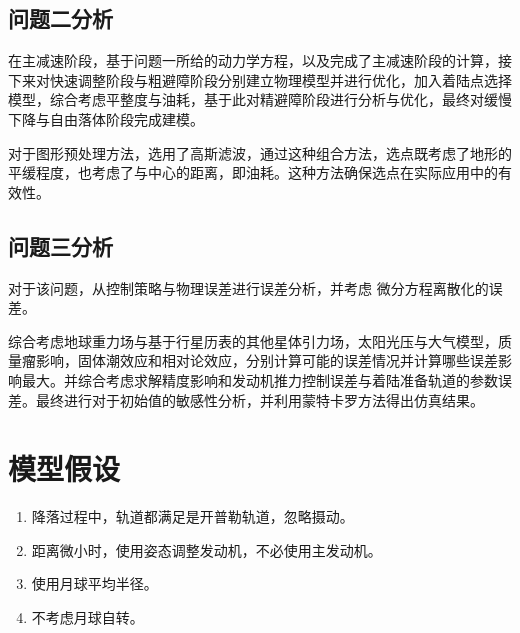 \documentclass{ctexart}
\begin{document}
    \subsection{问题二分析}
    在主减速阶段，基于问题一所给的动力学方程，以及完成了主减速阶段的计算，接下来对快速调整阶段与粗避障阶段分别建立物理模型并进行优化，加入着陆点选择模型，综合考虑平整度与油耗，基于此对精避障阶段进行分析与优化，最终对缓慢下降与自由落体阶段完成建模。

对于图形预处理方法，选用了高斯滤波，通过这种组合方法，选点既考虑了地形的平缓程度，也考虑了与中心的距离，即油耗。这种方法确保选点在实际应用中的有效性。
    \subsection{问题三分析}
    对于该问题，从控制策略与物理误差进行误差分析，并考虑
微分方程离散化的误差。

综合考虑地球重力场与基于行星历表的其他星体引力场，太阳光压与大气模型，质量瘤影响，固体潮效应和相对论效应，分别计算可能的误差情况并计算哪些误差影响最大。并综合考虑求解精度影响和发动机推力控制误差与着陆准备轨道的参数误差。最终进行对于初始值的敏感性分析，并利用蒙特卡罗方法得出仿真结果。
    \section{模型假设}
    \begin{enumerate}[(1)]
        \item 降落过程中，轨道都满足是开普勒轨道，忽略摄动。
        \item 距离微小时，使用姿态调整发动机，不必使用主发动机。
        \item 使用月球平均半径。
        \item 不考虑月球自转。
    \end{enumerate}
\end{document}
